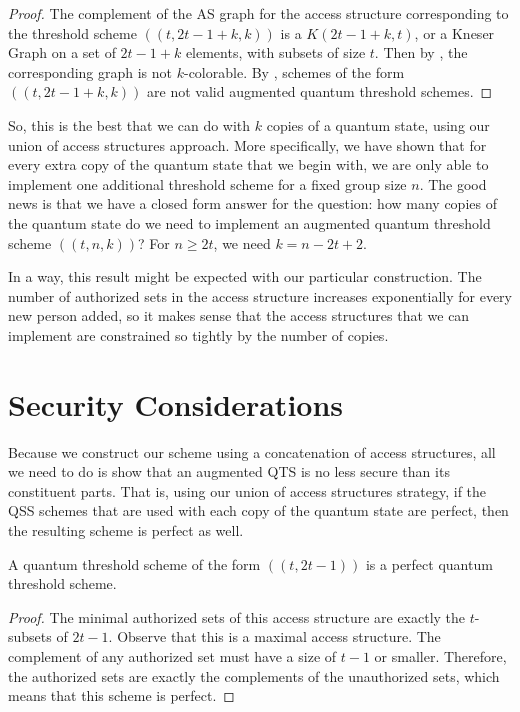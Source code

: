 \begin{proof}
    The complement of the AS graph for the access structure corresponding to the threshold scheme $((t,2t-1+k,k))$ is a $K(2t-1+k,t)$, or a Kneser Graph on a set of $2t-1+k$ elements, with subsets of size $t$. Then by , the corresponding graph is not $k$-colorable. By , schemes of the form $((t,2t-1+k,k))$ are not valid augmented quantum threshold schemes.
\end{proof}

So, this is the best that we can do with $k$ copies of a quantum state, using our union of access structures approach. More specifically, we have shown that for every extra copy of the quantum state that we begin with, we are only able to implement one additional threshold scheme for a fixed group size $n$. The good news is that we have a closed form answer for the question: how many copies of the quantum state do we need to implement an augmented quantum threshold scheme $((t,n,k))$? For $n \geq 2t$, we need $k = n - 2t + 2$.

In a way, this result might be expected with our particular construction. The number of authorized sets in the access structure increases exponentially for every new person added, so it makes sense that the access structures that we can implement are constrained so tightly by the number of copies.

\section{Security Considerations}

Because we construct our scheme using a concatenation of access structures, all we need to do is show that an augmented QTS is no less secure than its constituent parts. That is, using our union of access structures strategy, if the QSS schemes that are used with each copy of the quantum state are perfect, then the resulting scheme is perfect as well.

\begin{lemma}
    \label{lem:t-2t-1}
    A quantum threshold scheme of the form $((t,2t-1))$ is a perfect quantum threshold scheme.
\end{lemma}

\begin{proof}
    The minimal authorized sets of this access structure are exactly the $t$-subsets of $2t-1$. Observe that this is a maximal access structure. The complement of any authorized set must have a size of $t-1$ or smaller. Therefore, the authorized sets are exactly the complements of the unauthorized sets, which means that this scheme is perfect. 
\end{proof}

